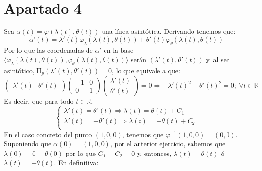\section{Apartado 4}
Sea $\alpha\left( t \right) = \varphi\left( \lambda \left( t \right), \theta
\left( t \right) \right)$ una línea asintótica. Derivando tenemos que:
\[
\alpha'\left( t \right) = \lambda'\left( t \right) \varphi_{\lambda}\left(
\lambda\left( t \right), \theta\left( t \right) \right) + \theta'\left( t
\right) \varphi_{\theta} \left( \lambda\left( t \right), \theta\left( t \right)
\right)
\]
Por lo que las coordenadas de $\alpha'$ en la base $\langle \varphi_{\lambda}
\left( \lambda\left( t \right), \theta\left( t \right) \right), \varphi_{\theta}
\left( \lambda \left( t \right), \theta\left( t \right) \right)\rangle$ serán
$\left( \lambda'\left( t \right), \theta'\left( t \right) \right)$ y, al ser
asintótico, $\mathrm{II}_p\left( \lambda'\left( t \right), \theta'\left( t
\right) \right) = 0$, lo que equivale a que:
\[
\begin{pmatrix}  \lambda'\left( t \right) & \theta'\left( t \right)  \end{pmatrix} \begin{pmatrix}
-1 & 0\\ 0 & 1 \end{pmatrix} \begin{pmatrix} \lambda'\left( t \right) \\
\theta'\left( t \right) \end{pmatrix} = 0 \Rightarrow -\lambda'\left( t
\right)^2 + \theta'\left( t \right)^2 = 0;\ \forall t \in \mathbb{R}
\]
Es decir, que para todo $t \in \mathbb{R}$,
\[
\begin{cases}
    \lambda'\left( t \right) = \theta'\left( t \right) \Rightarrow \lambda\left(
    t\right) = \theta\left( t \right) + C_1\\
    \lambda'\left( t \right) = -\theta'\left( t \right) \Rightarrow
    \lambda\left( t\right) = -\theta\left( t \right) + C_2\\
\end{cases}
\]
En el caso concreto del punto $\left( 1, 0, 0 \right)$, tenemos que
$\varphi^{-1}\left( 1, 0, 0 \right) = \left( 0, 0 \right)$. Suponiendo que
$\alpha\left( 0 \right) = \left( 1, 0, 0 \right)$, por el anterior ejercicio,
sabemos que $\lambda\left( 0 \right) = 0 = \theta\left( 0 \right)$ por lo que
$C_1 = C_2 = 0$ y, entonces, $\lambda\left( t \right) = \theta\left( t \right)$
ó $\lambda\left( t \right) = -\theta\left( t \right)$. En definitiva:
